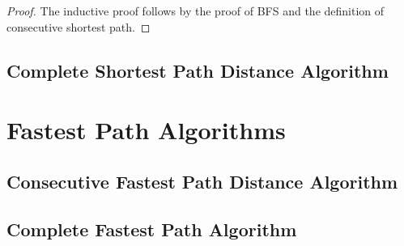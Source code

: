 \documentclass{article}
\theoremstyle{definition}
\numberwithin{thm}{subsection}
\begin{document}
\begin{proof}
  The inductive proof follows by the proof of BFS and the definition of
  consecutive shortest path.
\end{proof}

\subsection{Complete Shortest Path Distance Algorithm}

\section{Fastest Path Algorithms}

\subsection{Consecutive Fastest Path Distance Algorithm}

\subsection{Complete Fastest Path Algorithm}
\end{document}
